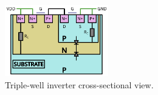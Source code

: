 
\begin{figure}[h]
	\label{fig_sub}
	\center
	\includegraphics[width=0.4\textwidth]{./figures/substrate.pdf}
	\caption{Triple-well inverter cross-sectional view.}
\end{figure}
